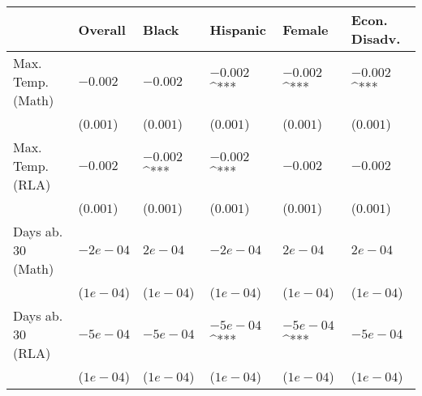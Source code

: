 
\begin{tabular}{l|l|l|l|l|l}
\hline
  & Overall & Black & Hispanic & Female & Econ. Disadv.\\
\hline
Max. Temp. (Math) & $-0.002$ & $-0.002$ & $-0.002$^{***} & $-0.002$^{***} & $-0.002$^{***}\\
\hline
 & ($0.001$) & ($0.001$) & ($0.001$) & ($0.001$) & ($0.001$)\\
\hline
Max. Temp. (RLA) & $-0.002$ & $-0.002$^{***} & $-0.002$^{***} & $-0.002$ & $-0.002$\\
\hline
 & ($0.001$) & ($0.001$) & ($0.001$) & ($0.001$) & ($0.001$)\\
\hline
Days ab. 30 (Math) & $-2e-04$ & $2e-04$ & $-2e-04$ & $2e-04$ & $2e-04$\\
\hline
 & ($1e-04$) & ($1e-04$) & ($1e-04$) & ($1e-04$) & ($1e-04$)\\
\hline
Days ab. 30 (RLA) & $-5e-04$ & $-5e-04$ & $-5e-04$^{***} & $-5e-04$^{***} & $-5e-04$\\
\hline
 & ($1e-04$) & ($1e-04$) & ($1e-04$) & ($1e-04$) & ($1e-04$)\\
\hline
\end{tabular}
